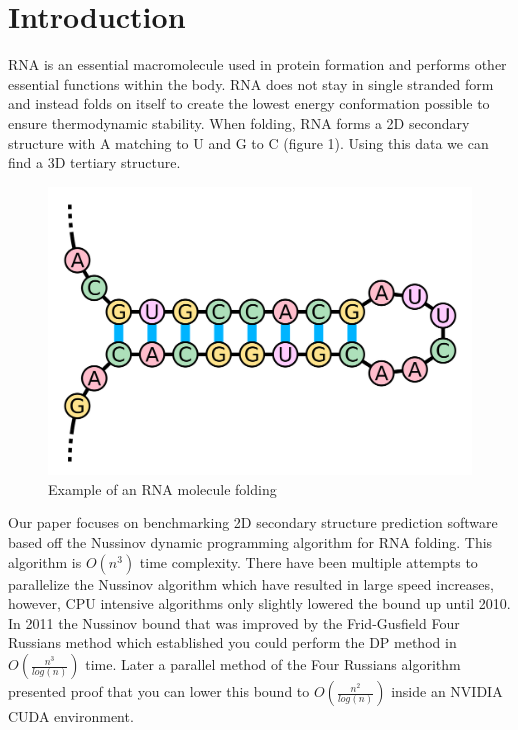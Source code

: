 \documentclass[12pt]{article}
\begin{document}
\section{Introduction}
\par RNA is an essential macromolecule used in protein formation and performs other essential functions within the body\cite{turner}. RNA does not stay in single stranded form and instead folds on itself to create the lowest energy conformation possible to ensure thermodynamic stability\cite{herschlag}. When folding, RNA forms a 2D secondary structure\cite{mccaskill} with A matching to U and G to C (figure 1).  Using this data we can find a 3D tertiary structure\cite{mccaskill}.
\begin{figure}[ht!]
  \centering
  \includegraphics[keepaspectratio, scale=0.12]{fold-example.png}
  \caption{Example of an RNA molecule folding}
  \label{fig:RNA Folding}
\end{figure}
\par Our paper focuses on benchmarking 2D secondary structure prediction software based off the Nussinov dynamic programming algorithm\cite{nussinov} for RNA folding. This algorithm is $O(n^3)$ time complexity. There have been multiple attempts to parallelize the Nussinov algorithm\cite{rizk, other-gpu} which have resulted in large speed increases, however, CPU intensive algorithms only slightly lowered the bound up until 2010\cite{minor-nussinov-improvement, chan}. In 2011 the Nussinov bound that was improved by the Frid-Gusfield Four Russians method which established you could perform the DP method in $O(\frac{n^3}{log(n)})$ time\cite{gusfield}. Later a parallel method of the Four Russians algorithm presented proof that you can lower this bound to $O(\frac{n^2}{log(n)})$ inside an NVIDIA CUDA environment\cite{balaji}.
\end{document}
